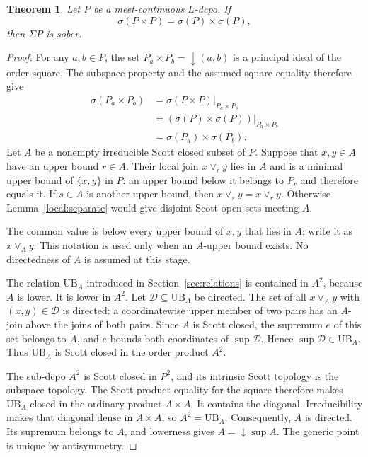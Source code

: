 \documentclass[10pt,a4paper]{article}
\newtheorem{theorem}{Theorem}[section]
\theoremstyle{definition}
\begin{document}
\begin{theorem}\label{local:sober}
Let $P$ be a meet-continuous $L$-dcpo. If
\[
 \sigma(P\times P)=\sigma(P)\times\sigma(P),
\]
then $\Sigma P$ is sober. %
\end{theorem}

\begin{proof}
For any $a,b\in P$, the set $P_a\times P_b={\downarrow}(a,b)$ is a principal ideal of the order square. The subspace property and the assumed square equality therefore give
\[
\begin{aligned}
 \sigma(P_a\times P_b)
 &=\left.\sigma(P\times P)\right|_{P_a\times P_b}\\
 &=\left.(\sigma(P)\times\sigma(P))\right|_{P_a\times P_b}\\
 &=\sigma(P_a)\times\sigma(P_b).
\end{aligned}
\]
Let $A$ be a nonempty irreducible Scott closed subset of $P$. Suppose that $x,y\in A$ have an upper bound $r\in A$. Their local join $x\vee_r y$ lies in $A$ and is a minimal upper bound of $\{x,y\}$ in $P$: an upper bound below it belongs to $P_r$ and therefore equals it. If $s\in A$ is another upper bound, then $x\vee_s y=x\vee_r y$. Otherwise Lemma~\ref{local:separate} would give disjoint Scott open sets meeting $A$.

The common value is below every upper bound of $x,y$ that lies in $A$; write it as $x\vee_A y$. This notation is used only when an $A$-upper bound exists. No directedness of $A$ is assumed at this stage.

The relation $\mathrm{UB}_A$ introduced in Section~\ref{sec:relations} is contained in $A^2$, because $A$ is lower. It is lower in $A^2$. Let $\mathcal D\subseteq\mathrm{UB}_A$ be directed. The set of all $x\vee_A y$ with $(x,y)\in\mathcal D$ is directed: a coordinatewise upper member of two pairs has an $A$-join above the joins of both pairs. Since $A$ is Scott closed, the supremum $e$ of this set belongs to $A$, and $e$ bounds both coordinates of $\sup\mathcal D$. Hence $\sup\mathcal D\in\mathrm{UB}_A$. Thus $\mathrm{UB}_A$ is Scott closed in the order product $A^2$.

The sub-dcpo $A^2$ is Scott closed in $P^2$, and its intrinsic Scott topology is the subspace topology. The Scott product equality for the square therefore makes $\mathrm{UB}_A$ closed in the ordinary product $A\times A$. It contains the diagonal. Irreducibility makes that diagonal dense in $A\times A$, so $A^2=\mathrm{UB}_A$. Consequently, $A$ is directed. Its supremum belongs to $A$, and lowerness gives $A={\downarrow}\sup A$. The generic point is unique by antisymmetry.
\end{proof}
\end{document}
